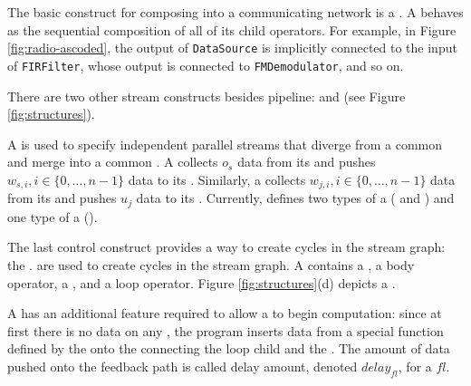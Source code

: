 

The basic construct for composing {\filters} into a communicating
network is a {\pipeline}.  A {\pipeline} behaves as the sequential
composition of all of its child operators.  For example, in Figure
\ref{fig:radio-ascoded}, the output of {\tt DataSource} is
implicitly connected to the input of {\tt FIRFilter}, whose output
is connected to {\tt FMDemodulator}, and so on.

There are two other stream constructs besides pipeline:
{\splitjoin} and {\feedbackloop} (see Figure
\ref{fig:structures}).

A {\splitjoin} is used to specify independent parallel streams
that diverge from a common {\splitter} and merge into a common
{\joiner}. A {\splitter} collects $o_s$ data from its {\Input}
{\Channel} and pushes $w_{s,i}, i \in \{0,\dots,n-1\}$ data to its
{\Output} {\Channels}. Similarly, a {\joiner} collects $w_{j,i}, i
\in \{0,\dots,n-1\}$ data from its {\Input} {\Channel} and pushes
$u_j$ data to its {\Output} {\Channel}. Currently, {\StreamIt}
defines two types of a {\splitter} ({\duplicate} and
{\roundrobin}) and one type of a {\joiner} ({\roundrobin}).

The last control construct provides a way to create cycles in the
stream graph: the {\feedbackloop}.  {\feedbackloops} are used to
create cycles in the stream graph. A {\feedbackloop} contains a
{\joiner}, a body operator, a {\splitter}, and a loop operator.
Figure \ref{fig:structures}(d) depicts a {\feedbackloop}.

A {\feedbackloop} has an additional feature required to allow a
{\feedbackloop} to begin computation: since at first there is no
data on any {\Channels}, the program inserts data from a special
function defined by the {\feedbackloop} onto the {\Channel}
connecting the loop child and the {\joiner}. The amount of data
pushed onto the feedback path is called delay amount, denoted
$delay_{fl}$, for a {\feedbackloop} $fl$.


